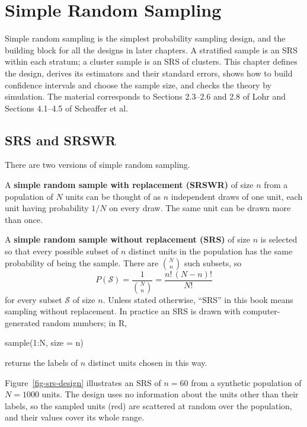 \documentclass[
  letterpaper,
  DIV=11,
  numbers=noendperiod]{scrreprt}
\newenvironment{Shaded}{\begin{snugshade}}{\end{snugshade}}
\newcommand{\AttributeTok}[1]{\textcolor[rgb]{0.40,0.45,0.13}{#1}}
\newcommand{\DecValTok}[1]{\textcolor[rgb]{0.68,0.00,0.00}{#1}}
\newcommand{\FunctionTok}[1]{\textcolor[rgb]{0.28,0.35,0.67}{#1}}
\newcommand{\NormalTok}[1]{\textcolor[rgb]{0.00,0.23,0.31}{#1}}
\newcommand{\SpecialCharTok}[1]{\textcolor[rgb]{0.37,0.37,0.37}{#1}}
\renewcommand{\[}{\begin{equation}}
\renewcommand{\]}{\end{equation}}
\begin{document}

\chapter{Simple Random Sampling}\label{simple-random-sampling}

Simple random sampling is the simplest probability sampling design, and
the building block for all the designs in later chapters. A stratified
sample is an SRS within each stratum; a cluster sample is an SRS of
clusters. This chapter defines the design, derives its estimators and
their standard errors, shows how to build confidence intervals and
choose the sample size, and checks the theory by simulation. The
material corresponds to Sections 2.3--2.6 and 2.8 of Lohr and Sections
4.1--4.5 of Scheaffer et al.

\section{SRS and SRSWR}\label{sec-srs-design}

There are two versions of simple random sampling.

A \textbf{simple random sample with replacement (SRSWR)} of size \(n\)
from a population of \(N\) units can be thought of as \(n\) independent
draws of one unit, each unit having probability \(1/N\) on every draw.
The same unit can be drawn more than once.

A \textbf{simple random sample without replacement (SRS)} of size \(n\)
is selected so that every possible subset of \(n\) distinct units in the
population has the same probability of being the sample. There are
\(\binom{N}{n}\) such subsets, so \[
P(\mathcal S) = \frac{1}{\binom{N}{n}} = \frac{n!\,(N-n)!}{N!}
\] for every subset \(\mathcal S\) of size \(n\). Unless stated
otherwise, ``SRS'' in this book means sampling without replacement. In
practice an SRS is drawn with computer-generated random numbers; in R,

\begin{Shaded}
\begin{Highlighting}[]
\FunctionTok{sample}\NormalTok{(}\DecValTok{1}\SpecialCharTok{:}\NormalTok{N, }\AttributeTok{size =}\NormalTok{ n)}
\end{Highlighting}
\end{Shaded}

returns the labels of \(n\) distinct units chosen in this way.

Figure~\ref{fig-srs-design} illustrates an SRS of \(n = 60\) from a
synthetic population of \(N = 1000\) units. The design uses no
information about the units other than their labels, so the sampled
units (red) are scattered at random over the population, and their
values cover its whole range.
\end{document}
